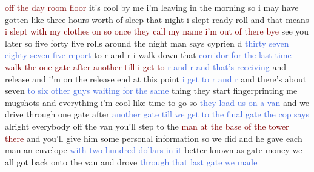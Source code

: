 \textcolor{Maroon}{off} \textcolor{Maroon}{the} \textcolor{Maroon}{day} \textcolor{Maroon}{room} \textcolor{Maroon}{floor} it's cool by me i'm leaving in the morning so i may have gotten like three hours worth of sleep that night i slept ready roll and that means \textcolor{Maroon}{i} \textcolor{Maroon}{slept} \textcolor{Maroon}{with} \textcolor{Maroon}{my} \textcolor{Maroon}{clothes} \textcolor{Maroon}{on} \textcolor{Maroon}{so} \textcolor{Maroon}{once} \textcolor{Maroon}{they} \textcolor{Maroon}{call} \textcolor{Maroon}{my} \textcolor{Maroon}{name} \textcolor{Maroon}{i'm} \textcolor{Maroon}{out} \textcolor{Maroon}{of} \textcolor{Maroon}{there} \textcolor{Maroon}{bye} see you later so five forty five rolls around the night man says cyprien d \textcolor{RoyalBlue}{thirty} \textcolor{RoyalBlue}{seven} \textcolor{RoyalBlue}{eighty} \textcolor{RoyalBlue}{seven} \textcolor{RoyalBlue}{five} \textcolor{RoyalBlue}{report} to r and r i walk down that \textcolor{RoyalBlue}{corridor} \textcolor{RoyalBlue}{for} \textcolor{RoyalBlue}{the} \textcolor{RoyalBlue}{last} \textcolor{RoyalBlue}{time} \textcolor{Maroon}{walk} \textcolor{Maroon}{the} \textcolor{Maroon}{one} \textcolor{Maroon}{gate} \textcolor{Maroon}{after} \textcolor{Maroon}{another} \textcolor{Maroon}{till} \textcolor{Maroon}{i} \textcolor{Maroon}{get} \textcolor{Maroon}{to} \textcolor{RoyalBlue}{r} \textcolor{RoyalBlue}{and} \textcolor{RoyalBlue}{r} \textcolor{RoyalBlue}{and} \textcolor{RoyalBlue}{that's} \textcolor{RoyalBlue}{receiving} and release and i'm on the release end at this point \textcolor{RoyalBlue}{i} \textcolor{RoyalBlue}{get} \textcolor{RoyalBlue}{to} \textcolor{RoyalBlue}{r} \textcolor{RoyalBlue}{and} \textcolor{RoyalBlue}{r} and there's about seven \textcolor{RoyalBlue}{to} \textcolor{RoyalBlue}{six} \textcolor{RoyalBlue}{other} \textcolor{RoyalBlue}{guys} \textcolor{RoyalBlue}{waiting} \textcolor{RoyalBlue}{for} \textcolor{RoyalBlue}{the} \textcolor{RoyalBlue}{same} thing they start fingerprinting me mugshots and everything i'm cool like time to go so \textcolor{RoyalBlue}{they} \textcolor{RoyalBlue}{load} \textcolor{RoyalBlue}{us} \textcolor{RoyalBlue}{on} \textcolor{RoyalBlue}{a} \textcolor{RoyalBlue}{van} and we drive through one gate after \textcolor{RoyalBlue}{another} \textcolor{RoyalBlue}{gate} \textcolor{RoyalBlue}{till} \textcolor{RoyalBlue}{we} \textcolor{RoyalBlue}{get} \textcolor{RoyalBlue}{to} \textcolor{RoyalBlue}{the} \textcolor{RoyalBlue}{final} \textcolor{RoyalBlue}{gate} \textcolor{RoyalBlue}{the} \textcolor{RoyalBlue}{cop} \textcolor{RoyalBlue}{says} alright everybody off the van you'll step to the \textcolor{Maroon}{man} \textcolor{Maroon}{at} \textcolor{Maroon}{the} \textcolor{Maroon}{base} \textcolor{Maroon}{of} \textcolor{Maroon}{the} \textcolor{Maroon}{tower} \textcolor{Maroon}{there} and you'll give him some personal information so we did and he gave each man an envelope \textcolor{RoyalBlue}{with} \textcolor{RoyalBlue}{two} \textcolor{RoyalBlue}{hundred} \textcolor{RoyalBlue}{dollars} \textcolor{RoyalBlue}{in} \textcolor{RoyalBlue}{it} better known as gate money we all got back onto the van and drove \textcolor{RoyalBlue}{through} \textcolor{RoyalBlue}{that} \textcolor{RoyalBlue}{last} \textcolor{RoyalBlue}{gate} \textcolor{RoyalBlue}{we} \textcolor{RoyalBlue}{made} 